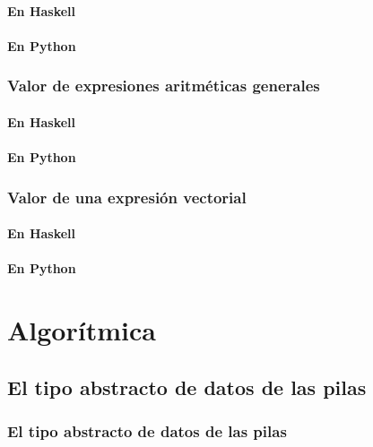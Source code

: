 \documentclass[a4paper,12pt,twoside]{book}
\begin{document}
\subsection{En Haskell}
\subsection{En Python}

\section{Valor de expresiones aritméticas generales}
\subsection{En Haskell}
\subsection{En Python}

\section{Valor de una expresión vectorial}
\subsection{En Haskell}
\subsection{En Python}

\part{Algorítmica}

\chapter{El tipo abstracto de datos de las pilas}

\section{El tipo abstracto de datos de las pilas}
\end{document}

